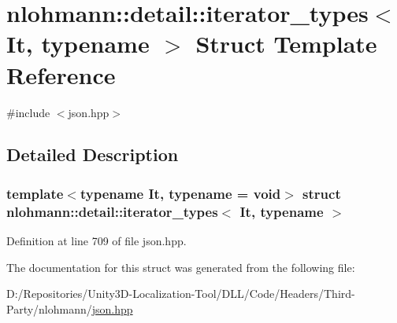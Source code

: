 \hypertarget{structnlohmann_1_1detail_1_1iterator__types}{}\section{nlohmann\+::detail\+::iterator\+\_\+types$<$ It, typename $>$ Struct Template Reference}
\label{structnlohmann_1_1detail_1_1iterator__types}


{\ttfamily \#include $<$json.\+hpp$>$}



\subsection{Detailed Description}
\subsubsection*{template$<$typename It, typename = void$>$\newline
struct nlohmann\+::detail\+::iterator\+\_\+types$<$ It, typename $>$}



Definition at line 709 of file json.\+hpp.



The documentation for this struct was generated from the following file\+:\begin{DoxyCompactItemize}
\item 
D\+:/\+Repositories/\+Unity3\+D-\/\+Localization-\/\+Tool/\+D\+L\+L/\+Code/\+Headers/\+Third-\/\+Party/nlohmann/\mbox{\hyperlink{json_8hpp}{json.\+hpp}}\end{DoxyCompactItemize}
